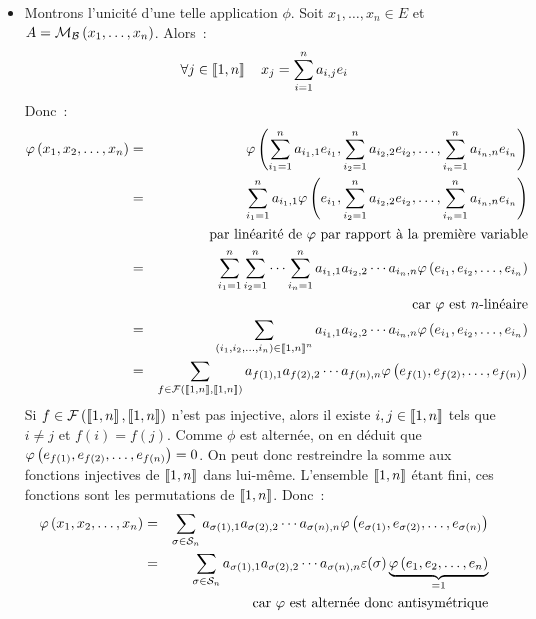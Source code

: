 \documentclass{magnolia}
\begin{document}
\begin{preuve}
$\quad$
\begin{itemize}
\item Montrons l'unicité d'une telle application $\phi$. Soit $x_1,\ldots,x_n\in E$
  et $A=\mathcal{M}_{\mathcal{B}}\left(x_1,\ldots,x_n\right)$. Alors~:
  \[\forall j\in\left\llbracket 1,n\right\rrbracket \quad x_j=\sum_{i=1}^n a_{i,j} e_i\]
  Donc~:
  \begin{eqnarray*}
  \varphi\left(x_1,x_2,\ldots,x_n\right)
  &=& \varphi\left(\sum_{i_1=1}^n a_{i_1,1} e_{i_1},\sum_{i_2=1}^n a_{i_2,2} e_{i_2},\ldots,
             \sum_{i_n=1}^n a_{i_n,n} e_{i_n}\right)\\
  &=& \sum_{i_1=1}^n a_{i_1,1} \varphi\left(e_{i_1},\sum_{i_2=1}^n a_{i_2,2} e_{i_2},\ldots,
             \sum_{i_n=1}^n a_{i_n,n} e_{i_n}\right)\\
  & & \text{par linéarité de $\varphi$ par rapport à la première variable}\\
  &=& \sum_{i_1=1}^n \sum_{i_2=1}^n \cdots \sum_{i_n=1}^n
       a_{i_1,1} a_{i_2,2} \cdots a_{i_n,n} \varphi\left(e_{i_1},e_{i_2},\ldots,e_{i_n}\right)\\
  & & \text{car $\varphi$ est $n$-linéaire}\\
  &=& \sum_{\left(i_1,i_2,\ldots,i_n\right)\in\left\llbracket 1,n\right\rrbracket^n}
       a_{i_1,1} a_{i_2,2} \cdots a_{i_n,n} \varphi\left(e_{i_1},e_{i_2},\ldots,e_{i_n}\right)\\
  &=& \sum_{f\in\mathcal{F}\left(\left\llbracket 1,n\right\rrbracket,\left\llbracket 1,n\right\rrbracket\right)}
       a_{f\left(1\right),1} a_{f\left(2\right),2} \cdots a_{f(n),n}
       \varphi\left(e_{f\left(1\right)},e_{f\left(2\right)},\ldots,e_{f(n)}\right)
  \end{eqnarray*}
  Si $f\in\mathcal{F}\left(\left\llbracket 1,n\right\rrbracket,\left\llbracket 1,n\right\rrbracket\right)$ n'est pas injective, alors il
  existe $i,j\in\left\llbracket 1,n\right\rrbracket$ tels que $i\neq j$ et $f(i)=f(j)$. Comme $\phi$
  est alternée, on en déduit que $\varphi\left(e_{f\left(1\right)},e_{f\left(2\right)},\ldots,e_{f(n)}\right)=0$.
  On peut donc restreindre la somme aux fonctions injectives de $\left\llbracket 1,n\right\rrbracket$
  dans lui-même. L'ensemble $\left\llbracket 1,n\right\rrbracket$ étant fini, ces fonctions sont les
  permutations de $\left\llbracket 1,n\right\rrbracket$. Donc~:
  \begin{eqnarray*}
  \phi\p{x_1,x_2,\ldots,x_n}
  &=& \sum_{\sigma\in\gsym{n}}
       a_{\sigma\p{1},1} a_{\sigma\p{2},2} \cdots a_{\sigma(n),n}
       \phi\p{e_{\sigma\p{1}},e_{\sigma\p{2}},\ldots,e_{\sigma(n)}}\\
  &=& \sum_{\sigma\in\gsym{n}}
       a_{\sigma\p{1},1} a_{\sigma\p{2},2} \cdots a_{\sigma(n),n} \signat{\sigma} 
       \underbrace{\phi\p{e_1,e_2,\ldots,e_n}}_{=1}\\
  & & \text{car $\phi$ est alternée donc antisymétrique}\\

\end{eqnarray*}
\end{itemize}
\end{preuve}
\end{document}
